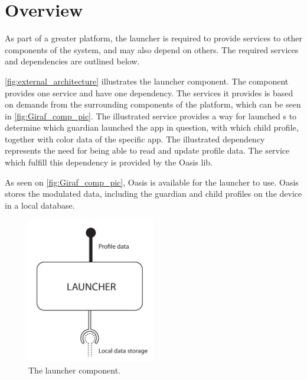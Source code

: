 \chapter{Overview}
\label{sec:design_overview}
As part of a greater platform, the launcher is required to provide services to other components of the \giraf[] system, and may also depend on others.
The required services and dependencies are outlined below.

\autoref{fig:external_architecture} illustrates the \giraf[] launcher component. The component provides one service and have one dependency.
The services it provides is based on demands from the surrounding components of the \giraf[] platform, which can be seen in \autoref{fig:Giraf_comp_pic}.
The illustrated service provides a way for launched \girafapp[]s to determine which guardian launched the app in question, with which child profile, together with color data of the specific app.
The illustrated dependency represents the need for being able to read and update profile data. The service which fulfill this dependency is provided by the Oasis lib. 

As seen on \autoref{fig:Giraf_comp_pic}, Oasis is available for the launcher to use. Oasis stores the modulated data, including the guardian and child profiles on the device in a local database.


\begin{figure}[h]
	\centering
	\includegraphics[width=0.5\textwidth]{gfx/external_launcher_architecture.pdf}
	\caption{The  \giraf[] launcher component.}
	\label{fig:external_architecture}
\end{figure}

